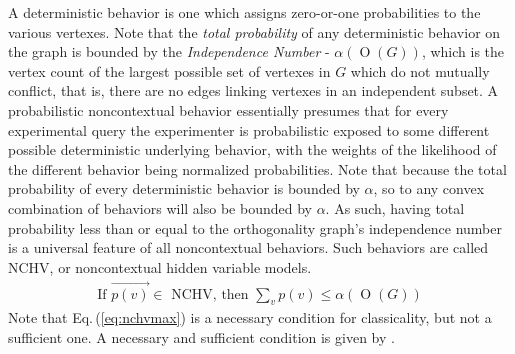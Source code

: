 \documentclass[
  12pt          %
  ,letterpaper  %
  ,center       %
  ,noupper      %
  ,english,fleqn]{uconnthesis}
\newcommand{\ceq}[1]{Eq.\,(\ref{#1})}
\begin{document}
A deterministic behavior is one which assigns zero-or-one probabilities to the various vertexes. Note that the {\em total probability} of any deterministic behavior on the graph is bounded by the {\em Independence Number} - $\alpha\left(\operatorname{O}{\left(G\right)}\right)$, which is the vertex count of the largest possible set of vertexes in $G$ which do not mutually conflict, that is, there are no edges linking vertexes in an independent subset. A probabilistic noncontextual behavior essentially presumes that for every experimental query the experimenter is probabilistic exposed to some different possible deterministic underlying behavior, with the weights of the likelihood of the different behavior being normalized probabilities. Note that because the total probability of every deterministic behavior is bounded by $\alpha$, so to any convex combination of behaviors will also be bounded by $\alpha$. As such, having total probability less than or equal to the orthogonality graph's independence number is a universal feature of all noncontextual behaviors. Such behaviors are called NCHV, or noncontextual hidden variable models. 
\begin{align}\label{eq:nchvmax}
\text{If }\overrightarrow{p(v)}\in \text{ NCHV, then }\sum_v{p(v)}\leq {\alpha{\left(\operatorname{O}{\left(G\right)}\right)}}
\end{align}
Note that \ceq{eq:nchvmax} is a necessary condition for classicality, but not a sufficient one. A necessary and sufficient condition is given by \citet[Prop. 4.3.1]{FritzCombinatorialLong}.
\end{document}

